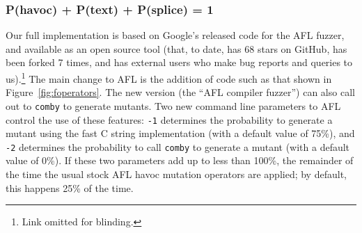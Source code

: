 \subsubsection{P(havoc) + P(text) + P(splice) = 1}

Our full implementation is based on Google's released code for the AFL
fuzzer, and available as an open source tool (that, to date, has 68
stars on GitHub, has been forked 7 times, and has external users who
make bug reports and queries to us).\footnote{Link omitted for
  blinding.}  The main change to AFL is the addition of code such as that shown in
Figure~\ref{fig:foperators}.  The new version (the ``AFL compiler
fuzzer'') can also call out to {\tt comby} to generate mutants.  Two
new command line parameters to AFL control the use of these features:
{\tt -1} determines the probability to generate a mutant using the
fast C string implementation (with a default value of 75\%), and {\tt -2} determines the probability
to call {\tt comby} to generate a mutant (with a default value of
0\%).  If these two parameters add up to less than 100\%, the
remainder of the time the usual stock AFL havoc mutation operators are
applied; by default, this happens 25\% of the time.
